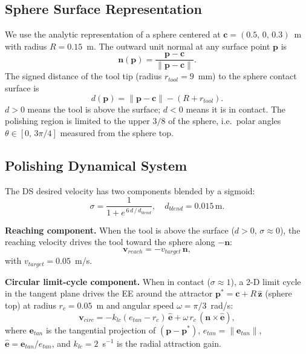 \documentclass[conference]{IEEEtran}
\newcommand{\nn}{\mathbf{n}}
\newcommand{\pp}{\mathbf{p}}
\begin{document}
\subsection{Sphere Surface Representation}

We use the analytic representation of a sphere centered at
$\mathbf{c} = (0.5,\,0,\,0.3)$~m with radius $R = 0.15$~m.
The outward unit normal at any surface point $\pp$ is
\begin{equation}
  \nn(\pp) = \frac{\pp - \mathbf{c}}{\|\pp - \mathbf{c}\|}.
\end{equation}
The signed distance of the tool tip (radius $r_{tool}=9$~mm) to the sphere
contact surface is
\begin{equation}
  d(\pp) = \|\pp - \mathbf{c}\| - (R + r_{tool}).
  \label{eq:signed_dist}
\end{equation}
$d > 0$ means the tool is above the surface; $d < 0$ means it is in contact.
The polishing region is limited to the upper $3/8$ of the sphere, i.e.\ polar
angles $\theta \in [0,\,3\pi/4]$ measured from the sphere top.

\subsection{Polishing Dynamical System}

The DS desired velocity has two components blended by a sigmoid:
\begin{equation}
  \sigma = \frac{1}{1 + e^{\,6\,d\,/\,d_{blend}}}, \quad d_{blend} = 0.015\,\text{m}.
  \label{eq:sigma}
\end{equation}

\textbf{Reaching component.}
When the tool is above the surface ($d > 0$, $\sigma \approx 0$), the
reaching velocity drives the tool toward the sphere along $-\nn$:
\begin{equation}
  \mathbf{v}_{reach} = -v_{target}\,\nn,
  \label{eq:vreach}
\end{equation}
with $v_{target} = 0.05$~m/s.

\textbf{Circular limit-cycle component.}
When in contact ($\sigma \approx 1$), a 2-D limit cycle in the tangent plane
drives the EE around the attractor $\pp^* = \mathbf{c} + R\,\hat{\mathbf{z}}$
(sphere top) at radius $r_c = 0.05$~m and angular speed $\omega = \pi/3$~rad/s:
\begin{equation}
  \mathbf{v}_{circ} = -k_{lc}(e_{tan} - r_c)\,\hat{\mathbf{e}} +
                       \omega\,r_c\,(\nn \times \hat{\mathbf{e}}),
  \label{eq:vcirc}
\end{equation}
where $\mathbf{e}_{tan}$ is the tangential projection of $(\pp - \pp^*)$,
$e_{tan} = \|\mathbf{e}_{tan}\|$, $\hat{\mathbf{e}} = \mathbf{e}_{tan}/e_{tan}$,
and $k_{lc} = 2$~s$^{-1}$ is the radial attraction gain.
\end{document}
